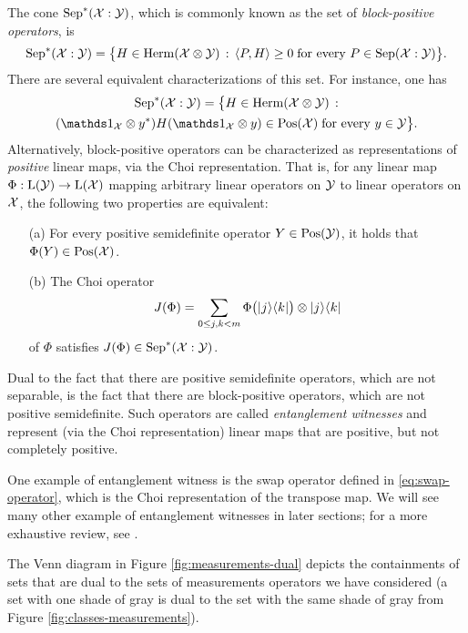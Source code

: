 The cone $\mathrm{Sep}^{\ast}(\mathcal{X} : \mathcal{Y})$, which is commonly known as the set of 
\emph{block-positive operators}, is
\begin{equation}
  \mathrm{Sep}^{\ast}(\mathcal{X}:\mathcal{Y}) = \bigl\{
  H\in\mathrm{Herm}(\mathcal{X}\otimes\mathcal{Y})\,:\,
  \langle P , H\rangle \geq 0 \;\text{for every $P \in \mathrm{Sep}(\mathcal{X}:\mathcal{Y})$}\bigr\}.
\end{equation}
There are several equivalent characterizations of this set.
For instance, one has
\begin{multline}
  \BPos(\X:\Y) = \bigl\{
  H\in\Herm(\X\otimes\Y)\,:\\
  (\I_{\X} \otimes y^{\ast}) H (\I_{\X} \otimes y)\in\Pos(\X)
  \;\text{for every $y\in\Y$}\bigr\}.
\end{multline}
Alternatively, block-positive operators can be characterized as representations 
of \emph{positive} linear maps, via the Choi representation.
That is, for any linear map $\Phi:\mathrm{L}(\mathcal{Y})\rightarrow\mathrm{L}(\mathcal{X})$
mapping arbitrary linear operators on $\mathcal{Y}$ to linear operators on $\mathcal{X}$, the
following two properties are equivalent:
\begin{itemize}
\item[(a)] For every positive semidefinite operator $Y \in \mathrm{Pos}(\mathcal{Y})$, it 
holds that $\Phi(Y) \in \mathrm{Pos}(\mathcal{X})$. 
\item[(b)] The Choi operator
\begin{equation}
  J(\Phi) = \sum_{0\leq j,k< m} \Phi\bigl(\lvert\mspace{0.5mu} j \mspace{0.5mu} \rangle\langle\mspace{0.5mu} k \mspace{0.5mu} \rvert\bigr) 
  \otimes \lvert\mspace{0.5mu} j \mspace{0.5mu} \rangle\langle\mspace{0.5mu} k \mspace{0.5mu} \rvert
\end{equation}
of $\Phi$ satisfies $J(\Phi) \in \mathrm{Sep}^{\ast}(\mathcal{X}:\mathcal{Y})$.
\end{itemize}

Dual to the fact that there are positive semidefinite operators, which are not 
separable, is the fact that there are block-positive operators, which are not 
positive semidefinite. Such operators are called \emph{entanglement witnesses} 
and represent (via the Choi representation) linear maps that are positive, 
but not completely positive.

One example of entanglement witness is the swap operator defined in 
\eqref{eq:swap-operator}, which is the Choi representation
of the transpose map.
We will see many other example of entanglement witnesses in later sections;
for a more exhaustive review, see \cite{Chruscinski2014}.

The Venn diagram in Figure \ref{fig:measurements-dual} depicts the containments
of sets that are dual to the sets of measurements operators we have considered  
(a set with one shade of gray is dual to the set with the same shade of gray from
Figure \ref{fig:classes-measurements}).

